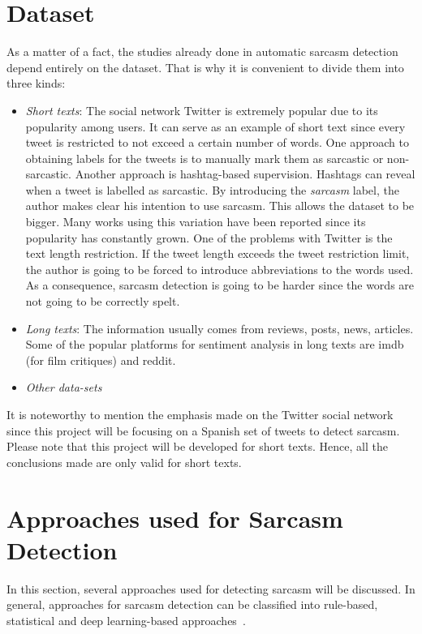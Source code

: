 \section{Dataset~\cite{joshi2017automatic}}

As a matter of a fact, the studies already done in automatic sarcasm detection depend entirely on the dataset. That is why it is convenient to divide them into three kinds:
\begin{itemize}
	\item \textit{Short texts}: The social network Twitter is extremely popular due to its popularity among users. It can serve as an example of short text since every tweet is restricted to not exceed a certain number of words. One approach to obtaining labels for the tweets is to manually mark them as sarcastic or non-sarcastic. Another approach is hashtag-based supervision. Hashtags can reveal when a tweet is labelled as sarcastic. By introducing the \textit{sarcasm} label, the author makes clear his intention to use sarcasm.  This allows the dataset to be bigger. Many works using this variation have been reported since its popularity has constantly grown. One of the problems with Twitter is the text length restriction. If the tweet length exceeds the tweet restriction limit, the author is going to be forced to introduce abbreviations to the words used. As a consequence, sarcasm detection is going to be harder since the words are not going to be correctly spelt.
	\item \textit{Long texts}: The information usually comes from reviews, posts, news, articles. Some of the popular platforms for sentiment analysis in long texts are imdb (for film critiques) and reddit. 
	\item \textit{Other data-sets}
\end{itemize}

It is noteworthy to mention the emphasis made on the Twitter social network since this project will be focusing on a Spanish set of tweets to detect sarcasm. Please note that this project will be developed for short texts. Hence, all the conclusions made are only valid for short texts.

\section{Approaches used for Sarcasm Detection}
\label{sec:sarcasmapproach}
In this section, several approaches used for detecting sarcasm will be discussed. In general, approaches for sarcasm detection can be classified into rule-based, statistical and deep learning-based approaches~\cite{joshi2017automatic}.
